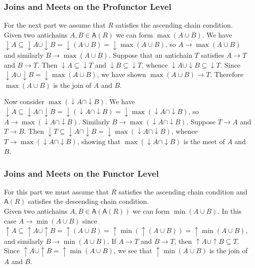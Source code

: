 \documentclass[12pt]{article}
\theoremstyle{definition}
\theoremstyle{plain}
\theoremstyle{plain}
\theoremstyle{plain}
\theoremstyle{plain}
\theoremstyle{remark}
\theoremstyle{remark}
\newcommand{\sub}{\subseteq}
\newcommand{\ac}{\mathsf{A}}
\begin{document}
\subsubsection{Joins and Meets on the Profunctor Level}
For the next part we assume that $R$ satisfies the ascending chain condition. \\

Given two antichains $A,B \in \ac(R)$ we can form $\max(A \cup B)$. We have $\downarrow A \sub \downarrow A \cup \downarrow B= \downarrow(A \cup B) = \downarrow \max(A \cup B)  $, so  $A \rightarrow \max(A \cup B)$ and similarly $B \rightarrow \max(A \cup B)$. Suppose that an antichain $T$ satisfies $A \rightarrow T$ and $B \rightarrow T$. Then $\downarrow A \sub \downarrow T$ and $\downarrow B  \sub \downarrow T$, whence $\downarrow A \cup \downarrow B \sub \downarrow T$. Since $\downarrow A \cup \downarrow B = \downarrow \max(A \cup B)$, we have shown $\max(A \cup B) \rightarrow T$. Therefore  $\max(A \cup B)$ is the join of $A$ and $B$.

Now consider $\max(\downarrow A \cap \downarrow B)$. We have $\downarrow A \sub \downarrow A \cap \downarrow B =\downarrow (\downarrow A \cap \downarrow B) = \downarrow\max(\downarrow A \cap \downarrow B) $, so $A \rightarrow \max(\downarrow A \cap \downarrow B)$. Similarly $B \rightarrow \max(\downarrow A \cap \downarrow B)$. Suppose $T \rightarrow A$ and $T \rightarrow B$. Then $\downarrow T \sub \downarrow A \cap \downarrow B = \downarrow\max(\downarrow A \cap \downarrow B) $, whence $T \rightarrow \max(\downarrow A \cap \downarrow B)$, showing that $\max(\downarrow A \cap \downarrow B)$ is the meet of $A$ and $B$.

\subsubsection{Joins and Meets on the Functor Level}
For this part we must assume that $R$ satisfies the ascending chain condition and $\ac(R)$ satisfies the descending chain condition. \\

Given two antichains $A,B \in \ac(\ac(R))$ we can form $\min(A \cup B)$. In this case $A \rightarrow \min(A \cup B)$ since $\uparrow A \sub \uparrow A \cup \uparrow B=\uparrow(A \cup B) = \uparrow \min (\uparrow (A \cup B))= \uparrow \min(A \cup B)$, and similarly $B \rightarrow \min(A \cup B)$. If $A \rightarrow T$ and $B \rightarrow T$, then $\uparrow A \cup \uparrow B \sub T$. Since $\uparrow A \cup \uparrow B = \uparrow \min(A \cup B)$, we see that $\uparrow \min(A \cup B)$ is the join of $A$ and $B$.
\end{document}
